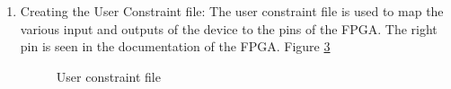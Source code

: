 \documentclass[12pt]{article}
\begin{document}
\begin{enumerate}
\begin{figure}[H]
\caption{RTL Schematics 3}
\label{fig:xil4}
\end{figure}
 
\begin{figure}[H]
\caption{Technology Schematics }
\label{fig:xil5}
\end{figure}
 
  \item Creating the User Constraint file: The user constraint file is used to map the various input and outputs of the device to the pins of the FPGA. The right pin is seen in the documentation of the FPGA. Figure \ref{fig:xil6}  
  
\begin{figure}[H]
\caption{User constraint file}
\label{fig:xil6}
\end{figure}  
  

\end{enumerate}
\end{document}
